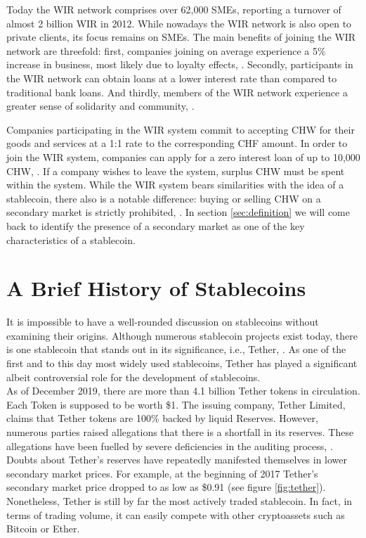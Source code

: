 \documentclass[conference]{IEEEtran}
\begin{document}
Today the WIR network comprises over 62,000 \acp{SME}, reporting a turnover of almost 2 billion WIR in 2012. While nowadays the WIR network is also open to private clients, its focus remains on \acp{SME}. The main benefits of joining the WIR network are threefold: first, companies joining on average experience a 5\% increase in business, most likely due to loyalty effects, \cite{Orell}. Secondly, participants in the WIR network can obtain loans at a lower interest rate than compared to traditional bank loans. And thirdly, members of the WIR network experience a greater sense of solidarity and community, \cite{Vuillaume}.

Companies participating in the WIR system commit to accepting CHW for their goods and services at a 1:1 rate to the corresponding CHF amount. In order to join the WIR system, companies can apply for a zero interest loan of up to 10,000 CHW, \cite{WIR2}. If a company wishes to leave the system, surplus CHW must be spent within the system. While the WIR system bears  similarities with the idea of a stablecoin, there also is a notable difference: buying or selling CHW on a secondary market is strictly prohibited, \cite{WIR}. In section \ref{sec:definition} we will come back to identify the presence of a secondary market as one of the key characteristics of a stablecoin. 

\section{A Brief History of Stablecoins}
\label{sec:history}
It is impossible to have a well-rounded discussion on stablecoins without examining their origins. Although numerous stablecoin projects exist today, there is one stablecoin that stands out in its significance, i.e., Tether, \cite{Consensys}. As one of the first and to this day most widely used stablecoins, Tether has played a significant albeit controversial role for the development of stablecoins.\\

As of December 2019, there are more than 4.1 billion Tether tokens in circulation. Each Token is supposed to be worth \$1. The issuing company, Tether Limited, claims that Tether tokens are 100\% backed by liquid Reserves. However, numerous parties raised allegations that there is a shortfall in its reserves. These allegations have been fuelled by severe deficiencies in
the auditing process, \cite{Tether}\cite{Forbes}. Doubts about Tether's reserves have repeatedly manifested themselves in lower secondary market prices. For example, at the beginning of 2017 Tether's secondary market price dropped to as low as \$0.91 (see figure \ref{fig:tether}). Nonetheless, Tether is still by far the most actively traded stablecoin. In fact, in terms of trading volume, it can easily compete with other cryptoassets such as Bitcoin or Ether.\cite{Coinmarketcap}\\ 
\end{document}
